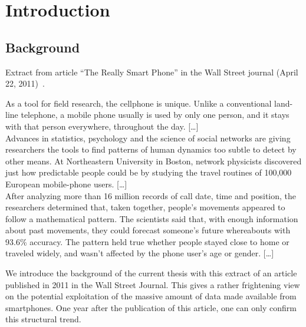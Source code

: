 \chapter*{Introduction}

\section*{Background}

Extract from article ``The Really Smart Phone'' in the Wall Street journal (April 22, 2011)~\cite{really-smart-phone}.

\begin{quotationalt}
  [\dots]
  As a tool for field research, the cellphone is unique. Unlike a
  conventional land-line telephone, a mobile phone usually is used by
  only one person, and it stays with that person everywhere,
  throughout the day.
  [\dots]\\

  Advances in statistics, psychology and the
  science of social networks are giving researchers the tools to find
  patterns of human dynamics too subtle to detect by other means. At
  Northeastern University in Boston, network physicists discovered
  just how predictable people could be by studying the travel routines
  of 100,000 European mobile-phone users.
  [\dots]\\

  After analyzing more than
  16 million records of call date, time and position, the researchers
  determined that, taken together, people's movements appeared to
  follow a mathematical pattern. The scientists said that, with enough
  information about past movements, they could forecast someone's
  future whereabouts with 93.6\% accuracy.
  The pattern held true whether people stayed close to home or
  traveled widely, and wasn't affected by the phone user's age or
  gender.
  [\dots]\\
\end{quotationalt}

We introduce the background of the current thesis with this extract of an article published in 2011 in the Wall Street Journal.
This gives a rather frightening view on the potential exploitation of the massive amount of data made available from smartphones.
One year after the publication of this article, one can only confirm this structural trend.\\

